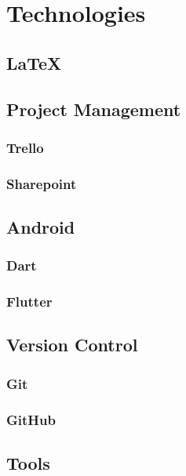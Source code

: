 \Author{\daAuthorOne}

\section{Technologies}

\subsection{LaTeX}

\subsection{Project Management}

\subsubsection{Trello}

\subsubsection{Sharepoint}


\subsection{Android}

\subsubsection{Dart}

\subsubsection{Flutter}

\subsection{Version Control}

\subsubsection{Git}

\subsubsection{GitHub}

\subsection{Tools}

